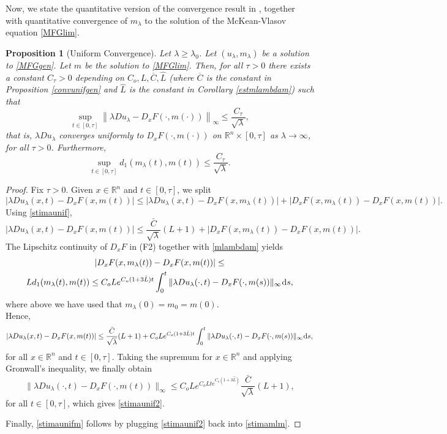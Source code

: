 \documentclass{amsart}
\newtheorem{prop}[thm]{Proposition}
\theoremstyle{remark}
\theoremstyle{definition}
\theoremstyle{Claim}
\newcommand{\dd}{\hspace{0.7pt}{\rm d}}
\theoremstyle{plain}
\begin{document}
	{Now, we state the quantitative version of the convergence result in \cite{BC}, together with quantitative convergence of $m_\lambda$ to the solution of the McKean-Vlasov equation \eqref{MFGlim}.
	\begin{prop}[Uniform Convergence]\label{quantitative}
		Let $\lambda\ge\lambda_0$. Let $(u_\lambda,m_\lambda)$ be a solution to \eqref{MFGgen}. Let $m$ be the solution to \eqref{MFGlim}. Then, for all $\tau>0$ there exists a constant $C_\tau > 0$ depending on $C_o, L, \overline C, \hat L$ (where $\overline{C}$ is the constant in Proposition \ref{convunifgen} and $\hat{L}$ is the constant in Corollary \ref{estmlambdam}) such that
		\begin{equation}\label{stimaunif2}
			\sup_{t\in [0,\tau]}\left\| \lambda D u_\lambda-D_xF(\cdot,m(\cdot))\right\|_\infty \le \frac{C_\tau}{\sqrt{\lambda}},
		\end{equation}
		that is, $\lambda Du_\lambda$ converges uniformly to $D_xF(\cdot,m(\cdot))$ on $\mathbb{R}^n\times [0,\tau]$ as $\lambda \to \infty$, for all $\tau>0$.
		Furthermore,
		\begin{equation}\label{stimaunifm}
		\sup_{t\in [0,\tau]}d_1(m_\lambda(t),m(t)) \le \frac{C_\tau}{\sqrt{\lambda}}.
	\end{equation}
	\end{prop}
\begin{proof}
	Fix $\tau>0$. Given $x\in \mathbb{R}^n$ and $t\in [0,\tau]$, we split
	$$\lvert \lambda D u_\lambda(x,t)-D_xF(x,m(t))\rvert\leq \lvert \lambda D u_\lambda(x,t)-D_xF(x,m_\lambda(t))\rvert+\lvert D_xF(x,m_\lambda(t))-D_xF(x,m(t))\rvert.$$
	Using \eqref{stimaunif},
		$$\lvert \lambda D u_\lambda(x,t)-D_xF(x,m(t))\rvert\leq  \frac{\bar{C}}{\sqrt{\lambda}}(L+1)+\lvert D_xF(x,m_\lambda(t))-D_xF(x,m(t))\rvert.$$
		The Lipschitz continuity of $D_xF$ in (F2) together with \eqref{mlambdam} yields
		\begin{multline}\label{stimamlm}\lvert D_xF(x,m_\lambda(t))-D_xF(x,m(t))\rvert\leq \\ Ld_1(m_\lambda(t),m(t))\leq C_oLe^{ C_o (1+3\hat{L})t} \int_0^t  \| \lambda D u_\lambda(\cdot,t) - D_xF(\cdot,m(s)) \|_\infty \dd s,
		\end{multline}
	where above we have used that $m_\lambda(0)=m_0=m(0)$.
	\\Hence, 
	$$\lvert \lambda D u_\lambda(x,t)-D_xF(x,m(t))\rvert\leq \frac{\bar{C}}{\sqrt{\lambda}}(L+1)+C_oLe^{ C_o (1+3\hat{L})t} \int_0^t  \| \lambda D u_\lambda(\cdot,t) - D_xF(\cdot,m(s)) \|_\infty \dd s,$$
	for all $x\in\mathbb{R}^n$ and $t\in [0,\tau]$. Taking the supremum for $x\in\mathbb{R}^n$ and applying Gronwall's inequality, we finally obtain
	$$\| \lambda D u_\lambda(\cdot,t) - D_xF(\cdot,m(t)) \|_\infty\leq C_oLe^{C_oLte^{C_o(1+3\hat{L})}}\frac{\bar{C}}{\sqrt{\lambda}}(L+1),$$
	for all $t\in [0,\tau]$, which gives \eqref{stimaunif2}.
	
	Finally, \eqref{stimaunifm} follows by plugging \eqref{stimaunif2} back into \eqref{stimamlm}.
	\end{proof} }
\end{document}
